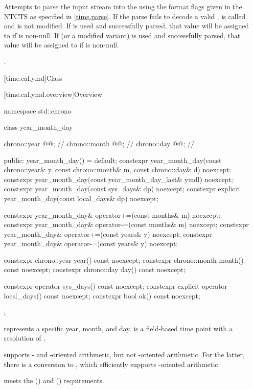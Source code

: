\begin{itemdescr}
\pnum
\effects
Attempts to parse the input stream 
into the   using
the format flags given in the NTCTS 
as specified in \ref{time.parse}.
If the parse fails to decode a valid ,
 is called and
 is not modified.
If  is used and successfully parsed,
that value will be assigned to  if  is non-null.
If  (or a modified variant) is used and successfully parsed,
that value will be assigned to  if  is non-null.

\pnum
\returns
{}.
\end{itemdescr}

[time.cal.ymd]{Class }

[time.cal.ymd.overview]{Overview}

\begin{codeblock}
namespace std::chrono {
  class year_month_day {
    chrono::year  @@;           // \expos
    chrono::month @@;           // \expos
    chrono::day   @@;           // \expos

  public:
    year_month_day() = default;
    constexpr year_month_day(const chrono::year& y, const chrono::month& m,
                             const chrono::day& d) noexcept;
    constexpr year_month_day(const year_month_day_last& ymdl) noexcept;
    constexpr year_month_day(const sys_days& dp) noexcept;
    constexpr explicit year_month_day(const local_days& dp) noexcept;

    constexpr year_month_day& operator+=(const months& m) noexcept;
    constexpr year_month_day& operator-=(const months& m) noexcept;
    constexpr year_month_day& operator+=(const years& y)  noexcept;
    constexpr year_month_day& operator-=(const years& y)  noexcept;

    constexpr chrono::year  year()  const noexcept;
    constexpr chrono::month month() const noexcept;
    constexpr chrono::day   day()   const noexcept;

    constexpr          operator sys_days()   const noexcept;
    constexpr explicit operator local_days() const noexcept;
    constexpr bool ok() const noexcept;
  };
}
\end{codeblock}

\pnum
{} represents a specific year, month, and day.
 is a field-based time point with a resolution of .
\begin{note}
 supports - and -oriented arithmetic,
but not -oriented arithmetic.
For the latter, there is a conversion to ,
which efficiently supports -oriented arithmetic.
\end{note}
 meets the  ()
and  () requirements.

